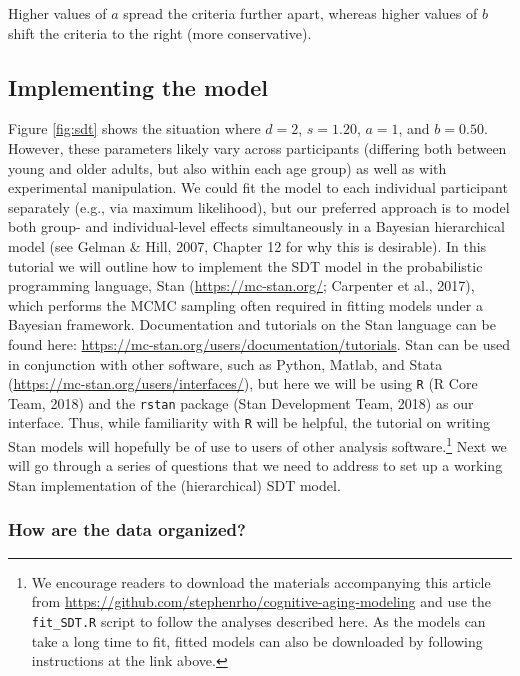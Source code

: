 \documentclass[
  english,
  ,man,floatsintext]{apa6}
\begin{document}
Higher values of \(a\) spread the criteria further apart, whereas higher values of \(b\) shift the criteria to the right (more conservative).

\hypertarget{implementing-the-model}{%
\subsection{Implementing the model}\label{implementing-the-model}}

Figure \ref{fig:sdt} shows the situation where \(d = 2\), \(s = 1.20\), \(a = 1\), and \(b = 0.50\). However, these parameters likely vary across participants (differing both between young and older adults, but also within each age group) as well as with experimental manipulation. We could fit the model to each individual participant separately (e.g., via maximum likelihood), but our preferred approach is to model both group- and individual-level effects simultaneously in a Bayesian hierarchical model (see Gelman \& Hill, 2007, Chapter 12 for why this is desirable). In this tutorial we will outline how to implement the SDT model in the probabilistic programming language, Stan (\url{https://mc-stan.org/}; Carpenter et al., 2017), which performs the MCMC sampling often required in fitting models under a Bayesian framework. Documentation and tutorials on the Stan language can be found here: \url{https://mc-stan.org/users/documentation/tutorials}. Stan can be used in conjunction with other software, such as Python, Matlab, and Stata (\url{https://mc-stan.org/users/interfaces/}), but here we will be using \texttt{R} (R Core Team, 2018) and the \texttt{rstan} package (Stan Development Team, 2018) as our interface. Thus, while familiarity with \texttt{R} will be helpful, the tutorial on writing Stan models will hopefully be of use to users of other analysis software.\footnote{We encourage readers to download the materials accompanying this article from \url{https://github.com/stephenrho/cognitive-aging-modeling} and use the \texttt{fit\_SDT.R} script to follow the analyses described here. As the models can take a long time to fit, fitted models can also be downloaded by following instructions at the link above.} Next we will go through a series of questions that we need to address to set up a working Stan implementation of the (hierarchical) SDT model.

\hypertarget{how-are-the-data-organized}{%
\subsubsection{How are the data organized?}\label{how-are-the-data-organized}}
\end{document}
